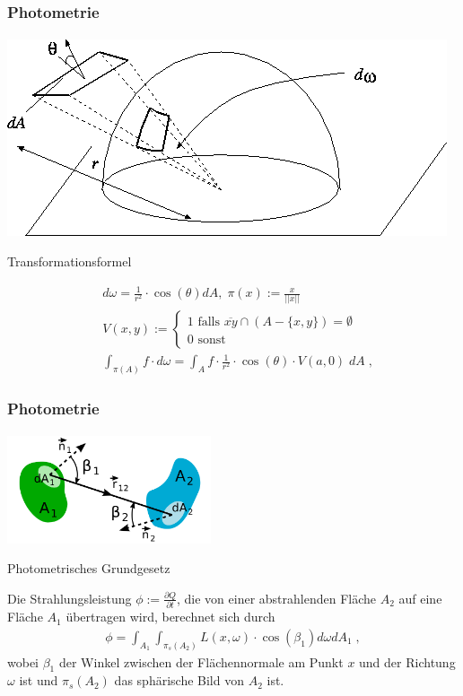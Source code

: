 \documentclass{beamer}
\begin{document}
\begin{frame}
    \frametitle{Photometrie}
\framesubtitle{}
\begin{center}
\includegraphics[scale=0.30]{images/solidangle}
\end{center}

\begin{block}{Transformationsformel}


\begin{align}
& d\omega =  \frac{1}{r^2} \cdot  \cos(\theta) dA, \;  \pi(x):=  \frac{x}{||x||}  \\
& V(x,y) := \begin{cases}
1 \text{ falls } \overline{xy} \cap (A -\{x,y\}) = \emptyset \\
0 \text{ sonst }
\end{cases} \\
& \int_{\pi(A)} f \cdot   d\omega  =  \int_{A} f  \cdot \frac{1}{r^2} \cdot  \cos(\theta) \cdot V(a, 0)  \; dA \; ,
\end{align}


\end{block}
\end{frame}


\begin{frame}
    \frametitle{Photometrie}
\framesubtitle{}
  \begin{center}

    \includegraphics[width=0.45\textwidth]{images/Fotometrisches_Grundgesetz_Schema.png}
\end{center}


\begin{block}{Photometrisches Grundgesetz}

Die Strahlungsleistung $\phi:= \frac{ \partial Q}{\partial t}$, die von einer abstrahlenden Fläche $A_2$  auf eine Fläche $A_1$ übertragen wird, berechnet sich durch
\begin{align}
\phi = \int_{A_1} \int_{\pi_s(A_2)} L(x, \omega)\cdot \cos(\beta_1) d\omega  dA_1   \; ,
\end{align}
wobei $\beta_1$ der Winkel zwischen der Flächennormale am Punkt $x$ und der Richtung $\omega$ ist und $\pi_s(A_2)$ das sphärische Bild von $A_2$ ist.
\end{block}
\end{frame}
\end{document}
